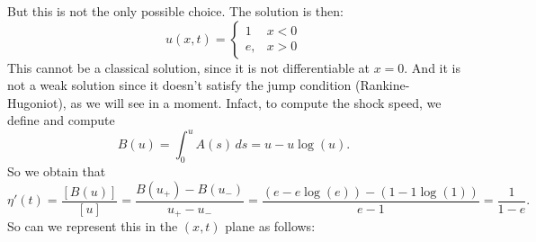 \begin{itemize}
\[          \]
          But this is not the only possible choice. The solution is then:
          \[
              u(x,t) = \begin{cases}
                  1  & x < 0 \\
                  e, & x > 0
              \end{cases}
          \]
          This cannot be a classical solution, since it is not differentiable at \(x=0\).
          And it is not a weak solution since it doesn't satisfy the jump condition (Rankine-Hugoniot), as
          we will see in a moment. Infact, to compute the shock speed, we define and
          compute
          \[B(u) = \int_0^u A(s) \, ds = u - u \log(u).\]
          So we obtain that
          \[
              \eta'(t) = \frac{[B(u)]}{[u]} = \frac{B(u_+)- B(u_-)}{u_+-u_-} = \frac{(e - e \log(e)) - (1 - 1 \log(1))}{e - 1} = \frac{1}{1-e}.
          \]
          So can we represent this in the \((x,t)\) plane as follows:
          \begin{center}
\end{center}
\end{itemize}
